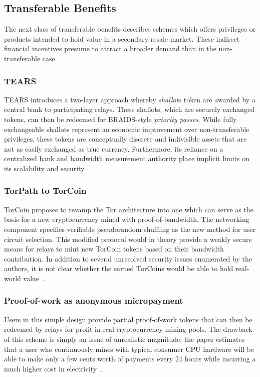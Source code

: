 \subsection{Transferable Benefits}

The next class of transferable benefits describes schemes which offers
privileges or products intended to hold value in a secondary resale market. These
indirect financial incentives presume to attract a broader demand than in the
non-transferable case.

\subsubsection{TEARS} TEARS introduces a two-layer approach whereby \emph{shallots}
token are awarded by a central bank to participating relays. These shallots,
which are securely exchanged tokens, can then be redeemed for BRAIDS-style
\emph{priority passes}. While fully exchangeable shallots represent an economic
improvement over non-transferable privileges, these tokens are conceptually
discrete and indivisible assets that are not as easily exchanged as true
currency. Furthermore, its reliance on a centralized bank and bandwidth
measurement authority place implicit limits on its scalability and
security~\cite{jansen2010recruiting}.

\subsubsection{TorPath to TorCoin} TorCoin proposes to revamp the Tor architecture into one which can serve as the
basis for a new cryptocurrency mined with proof-of-bandwidth. The networking
component specifies verifiable pseudorandom shuffling as the new method for user
circuit selection. This modified protocol would in theory provide a weakly
secure means for relays to mint new TorCoin tokens based on their bandwidth
contribution. In addition to several unresolved security issues enumerated by
the authors, it is not clear whether the earned TorCoins would be able to hold
real-world value~\cite{ghosh2014torpath}.

\subsubsection{Proof-of-work as anonymous micropayment} Users in this simple design
provide partial proof-of-work tokens that can then be redeemed by relays for
profit in real cryptocurrency mining pools. The drawback of this scheme is
simply an issue of unrealistic magnitude; the paper estimates that a user who
continuously mines with typical consumer CPU hardware will be able to make only
a few cents worth of payments every 24 hours while incurring a much higher cost
in electricity~\cite{biryukov2015proof}.
